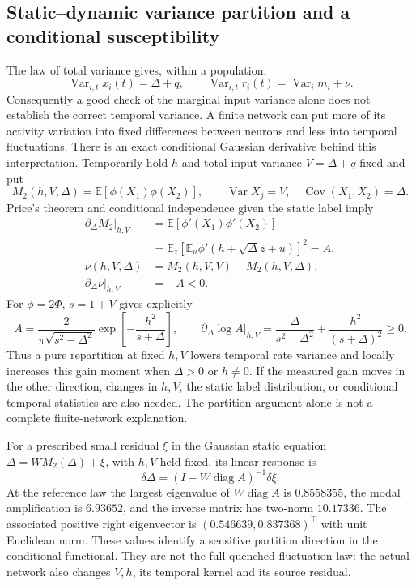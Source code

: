 \subsection{Static--dynamic variance partition and a conditional susceptibility}
The law of total variance gives, within a population,
\begin{equation}
 \operatorname{Var}_{i,t}x_i(t)=\Delta+q,\qquad
 \operatorname{Var}_{i,t}r_i(t)=\operatorname{Var}_i m_i+\nu.
\end{equation}
Consequently a good check of the marginal input variance alone does not
establish the correct temporal variance. A finite network can put more of
its activity variation into fixed differences between neurons and less into
temporal fluctuations.
There is an exact conditional Gaussian derivative behind this interpretation.
Temporarily hold $h$ and total input variance $V=\Delta+q$ fixed and put
\begin{equation}
 M_2(h,V,\Delta)=\mathbb E[\phi(X_1)\phi(X_2)],\qquad
 \operatorname{Var}X_j=V,\quad\operatorname{Cov}(X_1,X_2)=\Delta.
\end{equation}
Price's theorem and conditional independence given the static label imply
\begin{align}
 \partial_\Delta M_2\big|_{h,V}
 &=\mathbb E[\phi'(X_1)\phi'(X_2)]\\
 &=\mathbb E_z\left[\mathbb E_u\phi'(h+\sqrt\Delta z+u)\right]^2=A,\\
 \nu(h,V,\Delta)&=M_2(h,V,V)-M_2(h,V,\Delta),\\
 \partial_\Delta\nu\big|_{h,V}&=-A<0.
\end{align}
For $\phi=2\Phi$, $s=1+V$ gives explicitly
\begin{equation}
 A=\frac{2}{\pi\sqrt{s^2-\Delta^2}}
       \exp\left[-\frac{h^2}{s+\Delta}\right],\qquad
 \partial_\Delta\log A\big|_{h,V}
 =\frac{\Delta}{s^2-\Delta^2}+\frac{h^2}{(s+\Delta)^2}\ge0.
\end{equation}
Thus a pure repartition at fixed $h,V$ lowers temporal rate variance and
locally increases this gain moment when $\Delta>0$ or $h\ne0$. If the measured gain moves in the other direction,
changes in $h,V$, the static label distribution, or conditional temporal
statistics are also needed. The partition argument alone is not a complete
finite-network explanation.

For a prescribed small residual $\xi$ in the Gaussian static equation
$\Delta=W M_2(\Delta)+\xi$, with $h,V$ held fixed, its linear response is
\begin{equation}
 \delta\Delta=(I-W\operatorname{diag}A)^{-1}\delta\xi.
\end{equation}
At the reference law the largest eigenvalue of
$W\operatorname{diag}A$ is $0.8558355$, the modal amplification is $6.93652$,
and the inverse matrix has two-norm $10.17336$. The associated positive
right eigenvector is $(0.546639,0.837368)^\top$ with unit Euclidean norm.
These values identify a sensitive partition direction in the conditional
functional. They are not the full quenched fluctuation law: the actual
network also changes $V,h$, its temporal kernel and its source residual.

